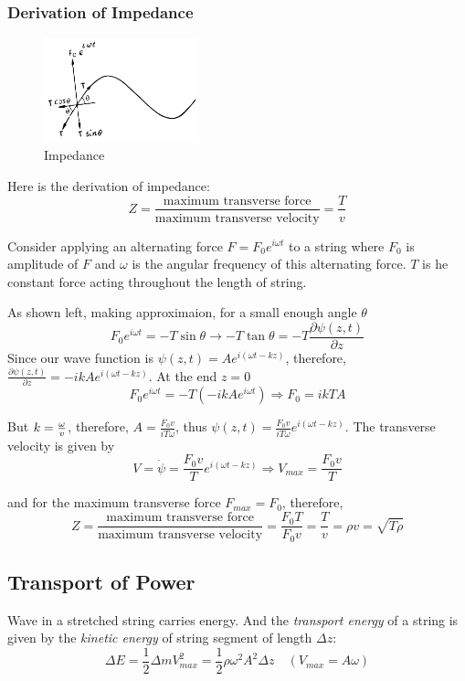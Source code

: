 \documentclass[openany]{book}
\begin{document}
\subsubsection{Derivation of Impedance}
\begin{figure}
  \vspace{-20pt}  
  \begin{center}
    \includegraphics[width=0.4\textwidth]{Figure/5.PNG}
  \end{center}
  \vspace{-20pt}    
  \caption{Impedance}
\end{figure}
Here is the derivation of impedance:
\[Z=\frac{\text{maximum transverse force}}{\text{maximum transverse velocity}}=\frac{T}{v}\]

Consider applying an alternating force $F=F_0e^{i\omega t}$ to a string where $F_0$ is amplitude of $F$ and $\omega $ is the angular frequency of this alternating force. $T$ is he constant force acting throughout the length of string. 

As shown left, making approximaion, for a small enough angle $\theta $
\[F_0e^{i\omega t}=-T\sin \theta \to -T\tan \theta =-T\frac{\partial \psi (z,t)}{\partial z}\]
Since our wave function is $\psi (z,t)=Ae^{i(\omega t-kz)}$, therefore, $\frac{\partial \psi (z,t)}{\partial z}=-ikAe^{i(\omega t-kz)}$. At the end $z=0$
\[F_0e^{i\omega t}=-T\left(-ikAe^{i\omega t}\right)\Rightarrow F_0=ikTA\]

But $k={\omega \over v}$, therefore, $A=\frac{F_0v}{iT\omega }$, thus $\psi (z,t)=\frac{F_0v}{iT\omega }e^{i(\omega t-kz )}$. The transverse velocity is given by
\[V=\dot{\psi }=\frac{F_0v}{T}e^{i(\omega t-kz )}\Rightarrow V_{max}=\frac{F_0v}{T}\]

and for the maximum transverse force $F_{max}=F_0$, therefore, 
\[Z=\frac{\text{maximum transverse force}}{\text{maximum transverse velocity}}=\frac{F_0T}{F_0v}=\frac{T}{v}=\rho v=\sqrt{T\rho }\] 
\subsection{Transport of Power}
Wave in a stretched string carries energy. And the \emph{transport energy} of a string is given by the \emph{kinetic energy} of string segment of length $\Delta z$:
\[\Delta E=\frac{1}{2}\Delta mV_{max}^2=\frac{1}{2}\rho \omega ^2A^2\Delta z\quad (V_{max}=A\omega )\]
\end{document}
